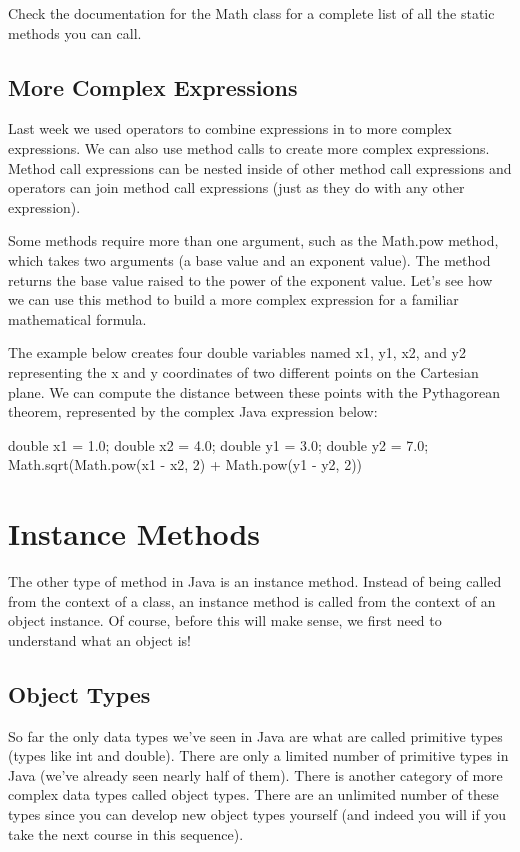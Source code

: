 Check the documentation for the Math class for a complete list of all the static methods you can call. 

\subsection{More Complex Expressions}

Last week we used operators to combine expressions in to more complex expressions. We can also use method calls to create more complex expressions. Method call expressions can be nested inside of other method call expressions and operators can join method call expressions (just as they do with any other expression). 

Some methods require more than one argument, such as the Math.pow method, which takes two arguments (a base value and an exponent value). The method returns the base value raised to the power of the exponent value. Let's see how we can use this method to build a more complex expression for a familiar mathematical formula. 

\begin{exa}
The example below creates four double variables named x1, y1, x2, and y2 representing the x and y coordinates of two different points on the Cartesian plane. We can compute the distance between these points with the Pythagorean theorem, represented by the complex Java expression below:

\begin{code}
double x1 = 1.0;
double x2 = 4.0;
double y1 = 3.0;
double y2 = 7.0;
Math.sqrt(Math.pow(x1 - x2, 2) + Math.pow(y1 - y2, 2))
\end{code}
\end{exa}

\section{Instance Methods}

The other type of method in Java is an instance method. Instead of being called from the context of a class, an instance method is called from the context of an object instance. Of course, before this will make sense, we first need to understand what an object is!

\subsection{Object Types}

So far the only data types we've seen in Java are what are called primitive types (types like int and double). There are only a limited number of primitive types in Java (we've already seen nearly half of them). There is another category of more complex data types called object types. There are an unlimited number of these types since you can develop new object types yourself (and indeed you will if you take the next course in this sequence). 

